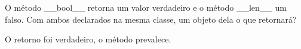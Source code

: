 \documentclass[letterpaper,10pt,brazil]{sphinxmanual}
\begin{document}
O método \_\_bool\_\_ retorna um valor verdadeiro e o método \_\_len\_\_ um falso.
Com ambos declarados na mesma classe, um objeto dela o que retornará?

\begin{sphinxVerbatim}[commandchars=\\\{\}]
  

\end{sphinxVerbatim}

\begin{sphinxVerbatim}[commandchars=\\\{\}]
\end{sphinxVerbatim}

O retorno foi verdadeiro, o método  prevalece.
\end{document}
